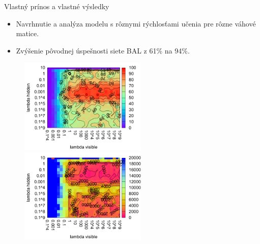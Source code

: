 \documentclass[xcolor=dvipsnames]{beamer}
\begin{document}
\begin{frame}{Vlastný prínos a vlastné výsledky}
  \begin{itemize}
    \item Navrhnutie a analýza modelu s rôznymi rýchlosťami učenia pre rôzne váhové matice.
    \item Zvýšenie pôvodnej úspešnosti siete BAL z 61\% na 94\%. 
  \end{itemize} 
  
  \begin{figure}[H]
    \centering
    \includegraphics[width=0.54\textwidth]{../text/img/tlr-auto4-success.pdf}   
    \includegraphics[width=0.54\textwidth]{../text/img/tlr-auto4-epoch.pdf}     
    \label{fig:results-tlr-auto4-performance}
  \end{figure}
\end{frame}
\end{document}
